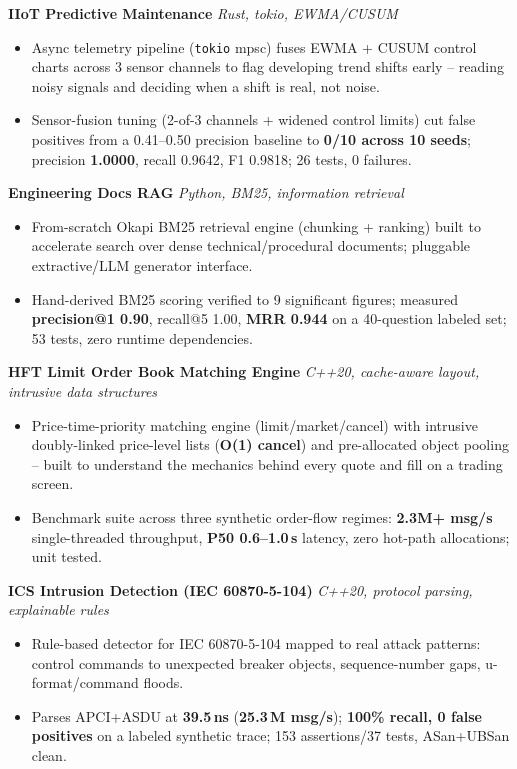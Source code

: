 \documentclass[10pt]{article}
\newcommand{\projectentry}[2]{%
  \noindent\textbf{#1} \hfill \textit{#2}\\[-0.3em]
}
\begin{document}
\projectentry{IIoT Predictive Maintenance}{Rust, tokio, EWMA/CUSUM}
\begin{itemize}
  \item Async telemetry pipeline (\texttt{tokio} mpsc) fuses EWMA + CUSUM control charts across 3 sensor channels to flag developing trend shifts early -- reading noisy signals and deciding when a shift is real, not noise.
  \item Sensor-fusion tuning (2-of-3 channels + widened control limits) cut false positives from a 0.41--0.50 precision baseline to \textbf{0/10 across 10 seeds}; precision \textbf{1.0000}, recall 0.9642, F1 0.9818; 26 tests, 0 failures.
\end{itemize}

\projectentry{Engineering Docs RAG}{Python, BM25, information retrieval}
\begin{itemize}
  \item From-scratch Okapi BM25 retrieval engine (chunking + ranking) built to accelerate search over dense technical/procedural documents; pluggable extractive/LLM generator interface.
  \item Hand-derived BM25 scoring verified to 9 significant figures; measured \textbf{precision@1 0.90}, recall@5 1.00, \textbf{MRR 0.944} on a 40-question labeled set; 53 tests, zero runtime dependencies.
\end{itemize}

\projectentry{HFT Limit Order Book Matching Engine}{C++20, cache-aware layout, intrusive data structures}
\begin{itemize}
  \item Price-time-priority matching engine (limit/market/cancel) with intrusive doubly-linked price-level lists (\textbf{O(1) cancel}) and pre-allocated object pooling -- built to understand the mechanics behind every quote and fill on a trading screen.
  \item Benchmark suite across three synthetic order-flow regimes: \textbf{2.3M+ msg/s} single-threaded throughput, \textbf{P50 0.6--1.0\,\textmu s} latency, zero hot-path allocations; unit tested.
\end{itemize}

\projectentry{ICS Intrusion Detection (IEC 60870-5-104)}{C++20, protocol parsing, explainable rules}
\begin{itemize}
  \item Rule-based detector for IEC 60870-5-104 mapped to real attack patterns: control commands to unexpected breaker objects, sequence-number gaps, u-format/command floods.
  \item Parses APCI+ASDU at \textbf{39.5\,ns} (\textbf{25.3\,M msg/s}); \textbf{100\% recall, 0 false positives} on a labeled synthetic trace; 153 assertions/37 tests, ASan+UBSan clean.
\end{itemize}
\end{document}
